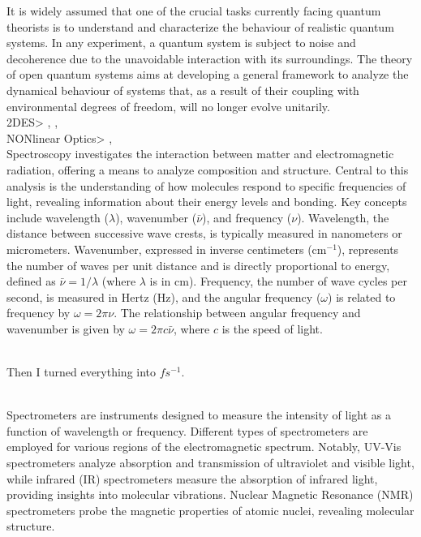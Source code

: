 It is widely assumed that one of the crucial tasks currently facing quantum theorists
is to understand and characterize the behaviour of realistic quantum systems. In
any experiment, a quantum system is subject to noise and decoherence due to the
unavoidable interaction with its surroundings. The theory of open quantum systems
aims at developing a general framework to analyze the dynamical behaviour of systems
that, as a result of their coupling with environmental degrees of freedom, will no
longer evolve unitarily. \cite{rivasMarkovianMasterEquations2010}
\\
2DES> \cite{krumland_two-dimensional_2023}, \cite{segarra-marti_towards_2018}, \cite{sun_two-dimensional_2024}
\\
NONlinear Optics> \cite{hamm_principles_nodate}, \cite{mukamel_principles_1995}
\\
Spectroscopy investigates the interaction between matter and electromagnetic radiation, offering a means to analyze composition and structure.
Central to this analysis is the understanding of how molecules respond to specific frequencies of light, revealing information about their energy levels and bonding.
Key concepts include wavelength ($\lambda$), wavenumber ($\bar{\nu}$), and frequency ($\nu$).
Wavelength, the distance between successive wave crests, is typically measured in nanometers or micrometers.
Wavenumber, expressed in inverse centimeters (cm$^{-1}$), represents the number of waves per unit distance and is directly proportional to energy, defined as $\bar{\nu} = 1/\lambda$ (where $\lambda$ is in cm).
Frequency, the number of wave cycles per second, is measured in Hertz (Hz), and the angular frequency ($\omega$) is related to frequency by $\omega = 2\pi\nu$.
The relationship between angular frequency and wavenumber is given by $\omega = 2\pi c \bar{\nu}$, where $c$ is the speed of light.

\\
Then I turned everything into $fs^{-1}$.


\\
Spectrometers are instruments designed to measure the intensity of light as a function of wavelength or frequency.
Different types of spectrometers are employed for various regions of the electromagnetic spectrum.
Notably, UV-Vis spectrometers analyze absorption and transmission of ultraviolet and visible light, while infrared (IR) spectrometers measure the absorption of infrared light, providing insights into molecular vibrations.
Nuclear Magnetic Resonance (NMR) spectrometers probe the magnetic properties of atomic nuclei, revealing molecular structure.




